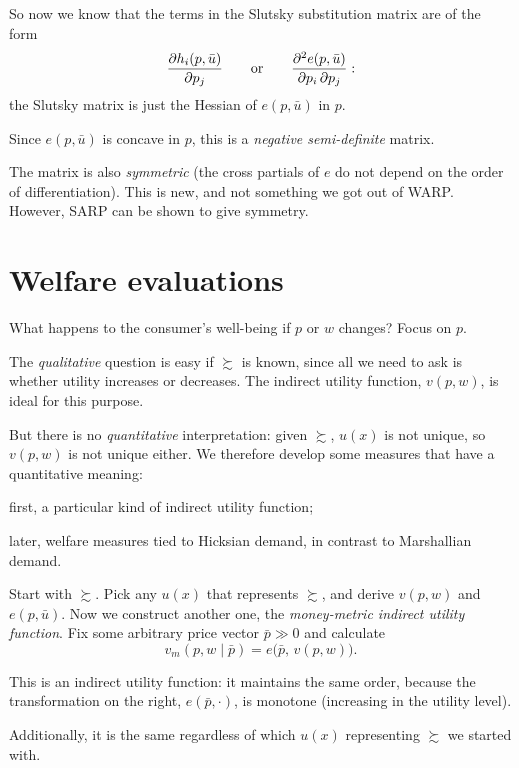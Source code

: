 \documentclass[11pt]{article}
\begin{document}
So now we know that the terms in the Slutsky substitution matrix are of the form
\[ \frac{\partial h_i(p,\bar u)}{\partial p_j}\qquad\text{or}\qquad
   \frac{\partial^2 e(p,\bar u)}{\partial p_i\,\partial p_j}: \]
the Slutsky matrix is just the Hessian of $e(p,\bar u)$ in $p$.
\begin{flatlist}
  \item Since $e(p,\bar u)$ is concave in $p$, this is a \emph{negative
        semi-definite} matrix.
  \item The matrix is also \emph{symmetric} (the cross partials of $e$ do not
        depend on the order of differentiation). This is new, and not something
        we got out of WARP. However, SARP can be shown to give symmetry.
\end{flatlist}


\section{Welfare evaluations}

What happens to the consumer's well-being if $p$ or $w$ changes? Focus on $p$.

The \emph{qualitative} question is easy if $\succsim$ is known, since all we need
to ask is whether utility increases or decreases. The indirect utility function,
$v(p,w)$, is ideal for this purpose.

But there is no \emph{quantitative} interpretation: given $\succsim$, $u(x)$ is not
unique, so $v(p,w)$ is not unique either. We therefore develop some measures that
have a quantitative meaning:
\begin{flatlist}
  \item first, a particular kind of indirect utility function;
  \item later, welfare measures tied to Hicksian demand, in contrast to Marshallian
        demand.
\end{flatlist}

Start with $\succsim$. Pick any $u(x)$ that represents $\succsim$, and derive
$v(p,w)$ and $e(p,\bar u)$. Now we construct another one, the \emph{money-metric
indirect utility function}. Fix some arbitrary price vector $\bar p\gg0$ and
calculate
\[ v_m(p,w\mid\bar p)=e\bigl(\bar p,\,v(p,w)\bigr). \]

\begin{flatlist}
  \item This is an indirect utility function: it maintains the same order, because
        the transformation on the right, $e(\bar p,\cdot)$, is monotone
        (increasing in the utility level).
  \item Additionally, it is the same regardless of which $u(x)$ representing
        $\succsim$ we started with.
\end{flatlist}
\end{document}
